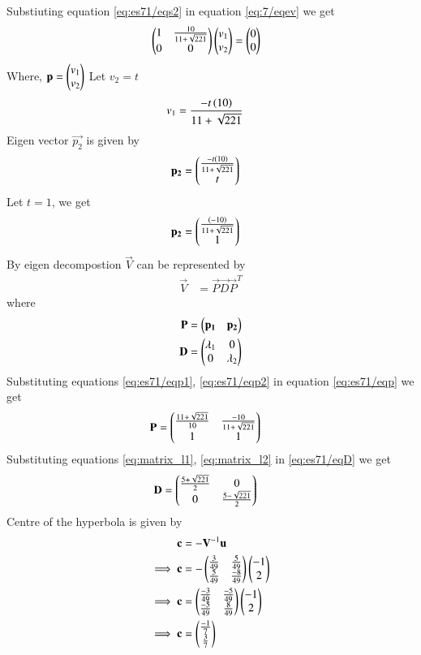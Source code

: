 \documentclass[journal,12pt,twocolumn]{IEEEtran}
\begin{document}
Substiuting equation \ref{eq:es71/eqs2} in equation \ref{eq:7/eqev} we get 
\begin{align}
    &\begin{pmatrix}1 & \frac{10}{11+\sqrt{221}} \\0 & 0\end{pmatrix}\begin{pmatrix}v_1 \\ v_2\end{pmatrix}=\begin{pmatrix}0 \\ 0\end{pmatrix}
\end{align}
Where, $\mathbf{p}=\begin{pmatrix}v_1\\v_2\end{pmatrix}$
Let $v_2=t$
\begin{align}
    v_1&=\frac{-t\left(10\right)}{11+\sqrt{221}}
\end{align}
Eigen vector $\vec{p_2}$ is given by
\begin{align}
        \mathbf{p_2}&=\begin{pmatrix}\frac{-t\left(10\right)}{11+\sqrt{221}} \\ t\end{pmatrix}
\end{align}
Let $t=1$, we get 
\begin{align}
    \mathbf{p_2}&=\begin{pmatrix}\frac{\left(-10\right)}{11+\sqrt{221}} \\1 \end{pmatrix}\label{eq:es71/eqp2}
\end{align}
By eigen decompostion $\vec{V}$ can be represented by
\begin{align}
    \vec{V}&=\vec{P}\vec{D}\vec{P}^T\label{eq:es71/eqsubs}
\end{align}
where 
\begin{align}
        \mathbf{P}&=\begin{pmatrix}\mathbf{p_1} & \mathbf{p_2}\end{pmatrix}\label{eq:es71/eqp}\\
    \mathbf{D}&=\begin{pmatrix}\lambda_1 & 0 \\0 & \lambda_2\end{pmatrix}\label{eq:es71/eqD}
\end{align}
Substituting equations \ref{eq:es71/eqp1}, \ref{eq:es71/eqp2} in equation \ref{eq:es71/eqp} we get 
\begin{align}
    \mathbf{P}&=\begin{pmatrix}\frac{11+\sqrt{221}}{10} & \frac{-10}{11+\sqrt{221}} \\1 & 1\end{pmatrix}\label{eq:es71/eqP}
\end{align}
Substituting equations \ref{eq:matrix_l1}, \ref{eq:matrix_l2} in \ref{eq:es71/eqD} we get
\begin{align}
       \mathbf{D}&=\begin{pmatrix}\frac{5+\sqrt{221}}{2} & 0\\0 & \frac{5-\sqrt{221}}{2}\end{pmatrix}\label{eq:es71/eqDD}
\end{align}
Centre of the hyperbola is given by 
\begin{align}
    \mathbf{c}&=-\mathbf{V}^{-1}\mathbf{u}\\
    \implies\mathbf{c}&=-\begin{pmatrix}\frac{3}{49}&\frac{5}{49}\\\frac{5}{49}&\frac{-8}{49}\end{pmatrix}\begin{pmatrix}-1 \\ 2\end{pmatrix}\\
    \implies\mathbf{c}&=\begin{pmatrix}\frac{-3}{49}&\frac{-5}{49}\\\frac{-5}{49}&\frac{8}{49}\end{pmatrix}\begin{pmatrix}-1 \\ 2\end{pmatrix}\\
    \implies\mathbf{c}&=\begin{pmatrix}\frac{-1}{7}\\\frac{3}{7}\end{pmatrix}
\end{align}
\end{document}
